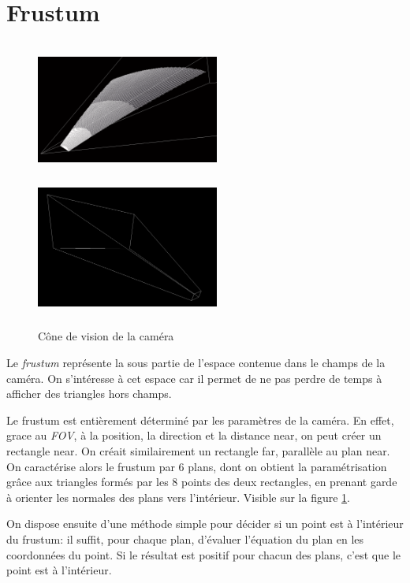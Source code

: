   
  \section{Frustum}
  \label{sec:Frustum}
  \begin{figure}[H]
  \centerline{
  \includegraphics[width=6cm,height=4.5cm]{img/culling.png}
  \includegraphics[width=6cm,height=4.5cm]{img/frustumbox.png}}
  \caption{Cône de vision de la caméra \protect\footnotemark}
  \label{fig:culling}
  \end{figure}
  
  Le \textit{frustum} représente la sous partie de l'espace contenue dans le champs de la caméra. On s'intéresse à cet espace car il permet de ne pas perdre de temps à afficher des triangles hors champs.
  
  

 
  Le frustum est entièrement déterminé par les paramètres de la caméra.  
  En effet, grace au \textit{FOV}, à la position, la direction et la distance near, on peut créer un rectangle near. On créait similairement un rectangle far, parallèle au plan near. On caractérise alors le frustum par 6 plans, dont on obtient la paramétrisation grâce aux triangles formés par les 8 points des deux rectangles, en prenant garde à orienter les normales des plans vers l'intérieur. Visible sur la figure \ref{fig:culling}.
  
  On dispose ensuite d'une méthode simple pour décider si un point est à l'intérieur du frustum: il suffit, pour chaque plan, d'évaluer l'équation du plan en les coordonnées du point. Si le résultat est positif pour chacun des plans, c'est que le point est à l'intérieur.
  
